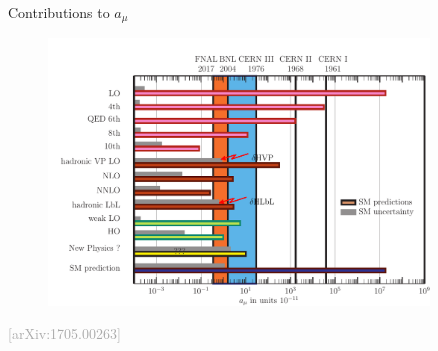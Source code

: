 \documentclass[hyperref={pdfpagelabels=false},ngerman]{beamer}
\newcommand{\mycite}[1]{\textcolor{darkgray}{\tiny [#1]}}
\begin{document}
\begin{frame}[noframenumbering]{Contributions to $a_\mu$}
  \begin{figure}
    \centering
    \includegraphics[width=0.9\textwidth]{plots/amu_contrib}
  \end{figure}
  \mycite{arXiv:1705.00263}
\end{frame}
\end{document}
